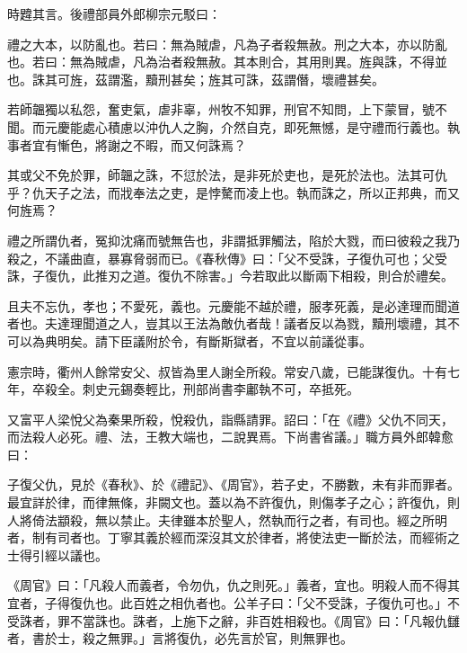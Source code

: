 \begin{pinyinscope}
 時韙其言。後禮部員外郎柳宗元駁曰：



 禮之大本，以防亂也。若曰：無為賊虐，凡為子者殺無赦。刑之大本，亦以防亂也。若曰：無為賊虐，凡為治者殺無赦。其本則合，其用則異。旌與誅，不得並也。誅其可旌，茲謂濫，黷刑甚矣；旌其可誅，茲謂僭，壞禮甚矣。



 若師韞獨以私怨，奮吏氣，虐非辜，州牧不知罪，刑官不知問，上下蒙冒，號不聞。而元慶能處心積慮以沖仇人之胸，介然自克，即死無憾，是守禮而行義也。執事者宜有慚色，將謝之不暇，而又何誅焉？



 其或父不免於罪，師韞之誅，不愆於法，是非死於吏也，是死於法也。法其可仇乎？仇天子之法，而戕奉法之吏，是悖驁而凌上也。執而誅之，所以正邦典，而又何旌焉？



 禮之所謂仇者，冤抑沈痛而號無告也，非謂抵罪觸法，陷於大戮，而曰彼殺之我乃殺之，不議曲直，暴寡脅弱而已。《春秋傳》曰：「父不受誅，子復仇可也；父受誅，子復仇，此推刃之道。復仇不除害。」今若取此以斷兩下相殺，則合於禮矣。



 且夫不忘仇，孝也；不愛死，義也。元慶能不越於禮，服孝死義，是必達理而聞道者也。夫達理聞道之人，豈其以王法為敵仇者哉！議者反以為戮，黷刑壞禮，其不可以為典明矣。請下臣議附於令，有斷斯獄者，不宜以前議從事。



 憲宗時，衢州人餘常安父、叔皆為里人謝全所殺。常安八歲，已能謀復仇。十有七年，卒殺全。刺史元錫奏輕比，刑部尚書李鄘執不可，卒抵死。



 又富平人梁悅父為秦果所殺，悅殺仇，詣縣請罪。詔曰：「在《禮》父仇不同天，而法殺人必死。禮、法，王教大端也，二說異焉。下尚書省議。」職方員外郎韓愈曰：



 子復父仇，見於《春秋》、於《禮記》、《周官》，若子史，不勝數，未有非而罪者。最宜詳於律，而律無條，非闕文也。蓋以為不許復仇，則傷孝子之心；許復仇，則人將倚法顓殺，無以禁止。夫律雖本於聖人，然執而行之者，有司也。經之所明者，制有司者也。丁寧其義於經而深沒其文於律者，將使法吏一斷於法，而經術之士得引經以議也。



 《周官》曰：「凡殺人而義者，令勿仇，仇之則死。」義者，宜也。明殺人而不得其宜者，子得復仇也。此百姓之相仇者也。公羊子曰：「父不受誅，子復仇可也。」不受誅者，罪不當誅也。誅者，上施下之辭，非百姓相殺也。《周官》曰：「凡報仇讎者，書於士，殺之無罪。」言將復仇，必先言於官，則無罪也。




\end{pinyinscope}
